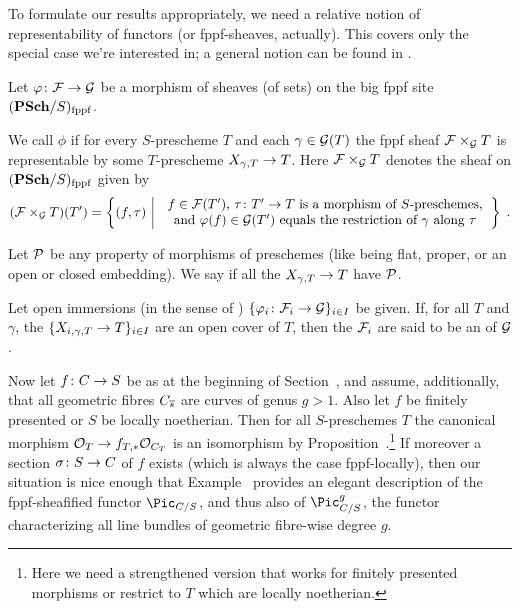 \documentclass[a4paper,parskip=half,numbers=enddot, DIV=12]{scrreprt}
\begin{document}
To formulate our results appropriately, we need a relative notion of representability of functors (or fppf-sheaves, actually). This covers only the special case we're interested in; a general notion can be found in \cite[]{stacks-project}.
\begin{defi}
	Let $\phi\colon\Ff\morphism\Gg$ be a morphism of sheaves (of sets) on the big fppf site $(\cat{PSch}/S)_\fppf$.
	\begin{alphanumerate}
		\item We call $\phi$  if for every $S$-prescheme $T$ and each $\gamma\in\mathcal{G}(T)$ the fppf sheaf $\mathcal{F}\times_{\mathcal{G}} T$ is representable by some $T$-prescheme $X_{\gamma,T}\morphism T$. Here $\mathcal{F}\times_{\mathcal{G}} T$ denotes the sheaf on $(\cat{PSch}/S)_\fppf$ given by
		\begin{align*}
			(\Ff\times_\Gg T)(T')=\left\{(f,\tau)\st
		\begin{tabular}{c}
			$f\in \Ff(T')$, $\tau\colon T'\morphism T$ is a morphism of $S$-preschemes,\\
			 and $\phi(f)\in\Gg(T')$ equals the restriction of $\gamma$ along $\tau$
		\end{tabular}\right\}\;.
		\end{align*}
		\item Let $\mathcal{P}$ be any property of morphisms of preschemes (like being flat, proper, or an open or closed embedding). We say  if all the $X_{\gamma,T}\morphism T$ have $\mathcal{P}$.
		\item Let open immersions (in the sense of ) $\{\phi_i\colon \Ff_i\morphism \Gg\}_{i\in I}$ be given. If, for all $T$ and $\gamma$, the $\{X_{i,\gamma,T}\morphism T\}_{i\in I}$ are an open cover of $T$, then the $\mathcal{F}_i$ are said to be an  of $\mathcal{G}$.
	\end{alphanumerate}
\end{defi}
Now let $f\colon C\morphism S$ be as at the beginning of Section~, and assume, additionally, that all geometric fibres $C_{\overline{s}}$ are curves of genus $g>1$. Also let $f$ be finitely presented or $S$ be locally noetherian. Then for all $S$-preschemes $T$ the canonical morphism $\Oo_T\morphism f_{T,*}\Oo_{C_T}$ is an isomorphism by Proposition~.\footnote{Here we need a strengthened version that works for finitely presented morphisms or restrict to $T$ which are locally noetherian.} If moreover a section $\sigma\colon S\morphism C$ of $f$ exists (which is always the case fppf-locally), then our situation is nice enough that Example~ provides an elegant description of the fppf-sheafified functor $\Pic_{C/S}$, and thus also of $\Pic_{C/S}^g$, the functor characterizing all line bundles of geometric fibre-wise degree $g$.
\end{document}
